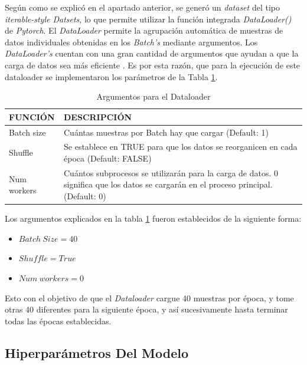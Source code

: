 Según como se explicó en el apartado anterior, se generó un \textit{dataset} del tipo \textit{iterable-style Datsets}, lo que permite utilizar la función integrada \textit{DataLoader()} de \textit{Pytorch}. El \textit{DataLoader} permite la agrupación automática de muestras de datos individuales obtenidas en los \textit{Batch's} mediante argumentos. Los \textit{DataLoader's} cuentan con una gran cantidad de argumentos que ayudan a que la carga de datos sea más eficiente \cite{Pytorch}. Es por esta razón, que para la ejecución de este dataloader se implementaron los parámetros de la Tabla \ref{table:Argumentos}.
\newpage			
\begin{table}[ht]
	\centering
	\begin{tabular}{|p{3cm}|p{8cm}|}
		\hline
		FUNCIÓN & DESCRIPCIÓN \\ 
		\hline
		Batch size & Cuántas muestras por Batch hay que cargar (Default: 1)\\
		\hline
		Shuffle & Se establece en TRUE para que los datos se reorganicen en cada época (Default: FALSE)  \\
		\hline
		Num workers & Cuántos subprocesos se utilizarán para la carga de datos. 0 significa que los datos se cargarán en el proceso principal. (Default: 0)\\
		\hline
	\end{tabular}	
	\caption{Argumentos para el Dataloader}
	\label{table:Argumentos}
\end{table}

Los argumentos explicados en la tabla \ref{table:Argumentos} fueron establecidos de la siguiente forma:

\begin{itemize}
	\item $Batch \ Size = 40$
	\item $Shuffle = True$
	\item $Num \ workers = 0$
\end{itemize}

Esto con el objetivo de que el \textit{Dataloader} cargue 40 muestras por época, y tome otras 40 diferentes para la siguiente época, y así sucesivamente hasta terminar todas las épocas establecidas.  





\subsection{Hiperparámetros Del Modelo}


